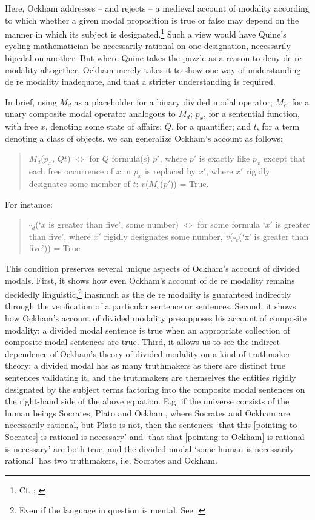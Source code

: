 \documentclass[a4paper]{article}
\begin{document}
\noindent Here, Ockham addresses – and rejects – a medieval account of modality according to which whether a given modal proposition is true or false may depend on the manner in which its subject is designated.\footnote{Cf. \cite[ch. 3, 12]{Anselm1974}; \cite[ch. 12]{AquinasDF}} Such a view would have Quine's cycling mathematician be necessarily rational on one designation, necessarily bipedal on another. But where Quine takes the puzzle as a reason to deny de re modality altogether, Ockham merely takes it to show one way of understanding de re modality inadequate, and that a stricter understanding is required.

In brief, using $M_{d}$ as a placeholder for a binary divided modal operator; $M_{c}$, for a unary composite modal operator analogous to $M_{d}$; $p_{x}$, for a sentential function, with free $x$, denoting some state of affairs; $Q$, for a quantifier; and $t$, for a term denoting a class of objects, we can generalize Ockham's account as follows:
\begin{quote}
$M_{d}$($p_{x}$, $Qt$) $\Leftrightarrow$ for $Q$ formula(s) $p'$, where  $p'$ is exactly like $p_{x}$ except that each free occurrence of $x$ in $p_{x}$ is replaced by $x'$, where $x'$ rigidly designates some member of $t$: $v$($M_{c}$($p'$)) = True.
\end{quote}

For instance:
\begin{quote}
$\square_{d}$(`$x$ is greater than five', some number) $\Leftrightarrow$ for some formula `$x'$ is greater than five', where $x'$ rigidly designates some number, $v$($\square_{c}$(`x' is greater than five')) = True
\end{quote}

This condition preserves several unique aspects of Ockham's account of divided modals. First, it shows how even Ockham's account of de re modality remains decidedly linguistic,\footnote{Even if the language in question is mental. See \cite{Panaccio1999}.}  inasmuch as the de re modality is guaranteed indirectly through the verification of a particular sentence or sentences. Second, it shows how Ockham's account of divided modality presupposes his account of composite modality: a divided modal sentence is true when an appropriate collection of composite modal sentences are true. Third, it allows us to see the indirect dependence of Ockham's theory of divided modality on a kind of truthmaker theory: a divided modal has as many truthmakers as there are distinct true sentences validating it, and the truthmakers are themselves the entities rigidly designated by the subject terms factoring into the composite modal sentences on the right-hand side of the above equation. E.g. if the universe consists of the human beings Socrates, Plato and Ockham, where Socrates and Ockham are necessarily rational, but Plato is not, then the sentences `that this [pointing to Socrates] is rational is necessary' and `that that [pointing to Ockham] is rational is necessary' are both true, and the divided modal `some human is necessarily rational' has two truthmakers, i.e. Socrates and Ockham.
\end{document}
